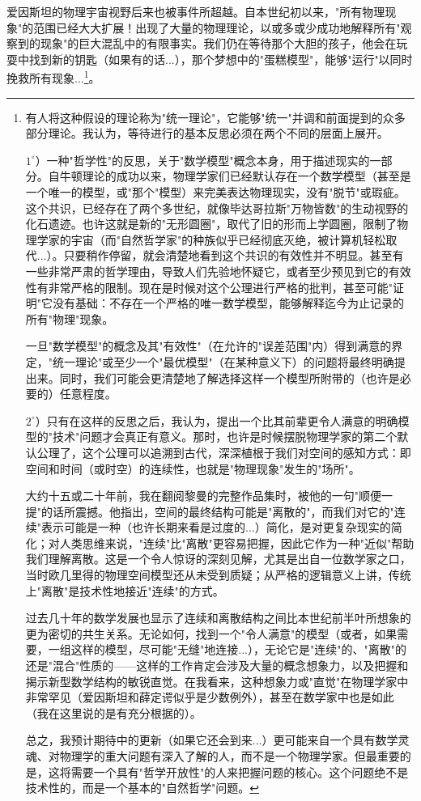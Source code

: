 爱因斯坦的物理宇宙视野后来也被事件所超越。自本世纪初以来，"所有物理现象"的范围已经大大扩展！出现了大量的物理理论，以或多或少成功地解释所有"观察到的现象"的巨大混乱中的有限事实。我们仍在等待那个大胆的孩子，他会在玩耍中找到新的钥匙（如果有的话...），那个梦想中的"蛋糕模型"，能够"运行"以同时挽救所有现象...\footnote{有人将这种假设的理论称为"统一理论"，它能够"统一"并调和前面提到的众多部分理论。我认为，等待进行的基本反思必须在两个不同的层面上展开。

$1^{\circ}$）一种"哲学性"的反思，关于"数学模型"概念本身，用于描述现实的一部分。自牛顿理论的成功以来，物理学家们已经默认存在一个数学模型（甚至是一个唯一的模型，或"那个"模型）来完美表达物理现实，没有"脱节"或瑕疵。这个共识，已经存在了两个多世纪，就像毕达哥拉斯"万物皆数"的生动视野的化石遗迹。也许这就是新的"无形圆圈"，取代了旧的形而上学圆圈，限制了物理学家的宇宙（而"自然哲学家"的种族似乎已经彻底灭绝，被计算机轻松取代...）。只要稍作停留，就会清楚地看到这个共识的有效性并不明显。甚至有一些非常严肃的哲学理由，导致人们先验地怀疑它，或者至少预见到它的有效性有非常严格的限制。现在是时候对这个公理进行严格的批判，甚至可能"证明"它没有基础：不存在一个严格的唯一数学模型，能够解释迄今为止记录的所有"物理"现象。

一旦"数学模型"的概念及其"有效性"（在允许的"误差范围"内）得到满意的界定，"统一理论"或至少一个"最优模型"（在某种意义下）的问题将最终明确提出来。同时，我们可能会更清楚地了解选择这样一个模型所附带的（也许是必要的）任意程度。

$2^{\circ}$）只有在这样的反思之后，我认为，提出一个比其前辈更令人满意的明确模型的"技术"问题才会真正有意义。那时，也许是时候摆脱物理学家的第二个默认公理了，这个公理可以追溯到古代，深深植根于我们对空间的感知方式：即空间和时间（或时空）的连续性，也就是"物理现象"发生的"场所"。

大约十五或二十年前，我在翻阅黎曼的完整作品集时，被他的一句"顺便一提"的话所震撼。他指出，空间的最终结构可能是"离散的"，而我们对它的"连续"表示可能是一种（也许长期来看是过度的...）简化，是对更复杂现实的简化；对人类思维来说，"连续"比"离散"更容易把握，因此它作为一种"近似"帮助我们理解离散。这是一个令人惊讶的深刻见解，尤其是出自一位数学家之口，当时欧几里得的物理空间模型还从未受到质疑；从严格的逻辑意义上讲，传统上"离散"是技术性地接近"连续"的方式。

过去几十年的数学发展也显示了连续和离散结构之间比本世纪前半叶所想象的更为密切的共生关系。无论如何，找到一个"令人满意"的模型（或者，如果需要，一组这样的模型，尽可能"无缝"地连接...），无论它是"连续"的、"离散"的还是"混合"性质的——这样的工作肯定会涉及大量的概念想象力，以及把握和揭示新型数学结构的敏锐直觉。在我看来，这种想象力或"直觉"在物理学家中非常罕见（爱因斯坦和薛定谔似乎是少数例外），甚至在数学家中也是如此（我在这里说的是有充分根据的）。

总之，我预计期待中的更新（如果它还会到来...）更可能来自一个具有数学灵魂、对物理学的重大问题有深入了解的人，而不是一个物理学家。但最重要的是，这将需要一个具有"哲学开放性"的人来把握问题的核心。这个问题绝不是技术性的，而是一个基本的"自然哲学"问题。}。

